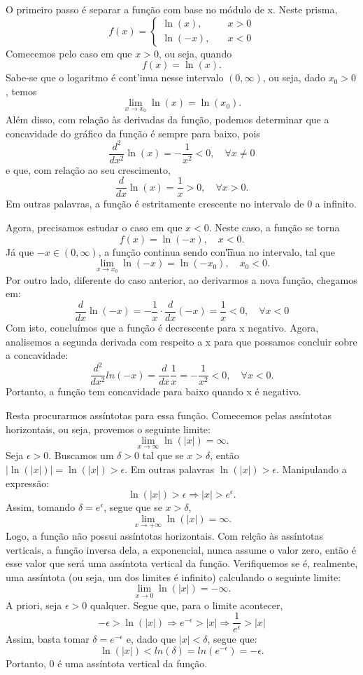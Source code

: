 \documentclass[exercícios_de_cálculo.tex]{subfiles}
\begin{document}
\begin{proof*}
	O primeiro passo é separar a função com base no módulo de x. Neste
	prisma,
	\[
		f(x) = \left\{
		\begin{array}{ll}
			\ln(x), \quad  & x > 0 \\
			\ln(-x), \quad & x < 0
		\end{array}\right.
	\]
	Comecemos pelo caso em que $x > 0$, ou seja, quando
	\[
		f(x) = \ln(x).
	\]
	Sabe-se que o logaritmo é cont'inua nesse intervalo $(0, \infty)$, ou seja,
	dado $x_{0}> 0$, temos
	\[
		\lim_{x\to{x_0}}\ln(x) = \ln(x_{0}).
	\]
	Além disso, com relação às derivadas da função, podemos
	determinar que a concavidade do gráfico da função é sempre para baixo,
	pois
	\[
		\frac{d^{2}}{dx^{2}}\ln(x) = -\frac{1}{x^{2}}< 0, \quad \forall x\neq0
	\]
	e que, com relação ao seu crescimento,
	\[
		\frac{d}{dx}\ln(x) = \frac{1}{x}> 0, \quad \forall x > 0.
	\]
	Em outras palavras, a função é estritamente crescente no intervalo de 0
	a infinito.

	Agora, precisamos estudar o caso em que $x < 0$. Neste caso, a função se torna
	\[
		f(x) = \ln(-x),\quad x < 0.
	\]
	Já que $-x\in(0, \infty)$, a função continua sendo con\t'inua no
	intervalo, tal que
	\[
		\lim_{x\to{x_0}}\ln(-x) = \ln(-x_{0}), \quad x_{0}< 0.
	\]
	Por outro lado, diferente do caso anterior, ao derivarmos a nova função, chegamos
	em:
	\[
		\frac{d}{dx}\ln(-x) = -\frac{1}{x}\cdot\frac{d}{dx}(-x) = \frac{1}{x}< 0, \quad \forall x < 0
	\]
	Com isto, concluímos que a função é decrescente para x negativo.
	Agora, analisemos a segunda derivada com respeito a x para que possamos concluir
	sobre a concavidade:
	\[
		\frac{d^{2}}{d x^{2}}ln(-x) = \frac{d}{dx}\frac{1}{x}= -\frac{1}{x^{2}}< 0, \quad \forall x < 0.
	\]
	Portanto, a função tem concavidade para baixo quando x é negativo.

	Resta procurarmos assíntotas para essa função. Comecemos pelas ass\'intotas horizontais,
	ou seja, provemos o seguinte limite:
	$$
		\lim_{x\to\infty} \ln(|x|) = \infty.
	$$
	Seja $\epsilon > 0$. Buscamos um $\delta > 0$ tal que se $x > \delta$, então $|\ln(|x|)| = \ln(|x|) > \epsilon$.
	Em outras palavras $\ln(|x|) > \epsilon$. Manipulando a expressão:
	$$
		\ln(|x|) > \epsilon \Rightarrow |x| >  e^{\epsilon}.
	$$
	Assim, tomando $\delta = e^{\epsilon}$, segue que se $x > \delta$,
	$$
		\lim_{x\to+\infty}\ln(|x|) = \infty.
	$$
	Logo, a função não possui assíntotas horizontais. Com relç\~ao às ass\'intotas
	verticais, a função inversa dela, a exponencial, nunca assume o valor zero, então é esse valor
	que será uma assíntota vertical da função. Verifiquemos se é, realmente, uma ass\'intota (ou seja, um dos
	limites é infinito) calculando o seguinte limite:
	$$
		\lim_{x\to0}\ln(|x|) = -\infty.
	$$
	A priori, seja $\epsilon > 0$ qualquer. Segue que, para o limite acontecer,
	$$
		-\epsilon > \ln(|x|) \Rightarrow e^{-\epsilon} > |x| \Rightarrow \frac{1}{e^{\epsilon}} > |x|
	$$
	Assim, basta tomar $\delta = e^{-\epsilon}$ e, dado que $|x| < \delta$, segue que:
	$$
		\ln(|x|) < ln(\delta) = ln(e^{-\epsilon}) = -\epsilon.
	$$
	Portanto, 0 é uma assíntota vertical da função.
\end{proof*}
\end{document}
